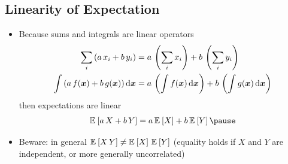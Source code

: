 \begin{slide}
\section[-2]{Linearity of Expectation}

\begin{PauseHighLight}
  \begin{itemize}
  \item Because sums and integrals are linear operators
    \begin{align*}
      \sum_i \left( a\,x_i + b\,y_i \right)
      &= a\,\left(  \sum_i  x_i \right) +  b\,\left( \sum_i y_i \right) \\
      \int \left( a\,f(\bm{x}) + b\, g(\bm{x}) \right) \mathrm{d} \bm{x}
      &=a \, \left(  \int f(\bm{x})\, \mathrm{d} \bm{x} \right) + b \,  \left(  \int g(\bm{x})\, \mathrm{d} \bm{x} \right)
    \end{align*}
    then expectations are linear
    \begin{align*}
      \av{a\,X + b\,Y} = a\,\av{X} + b\, \av{Y}\pause
    \end{align*}
  \item Beware: in general $\mathbb{E}_{}\left[ X\,Y \right]\neq \mathbb{E}_{}\left[ X \right]\,\mathbb{E}_{}\left[ Y \right]$ (equality holds
    if $X$ and $Y$ are independent, or more generally uncorrelated)\pause
  \end{itemize}
\end{PauseHighLight}

\end{slide}


